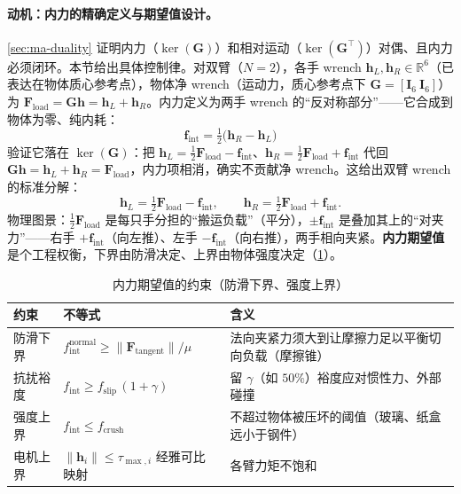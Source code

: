 \paragraph{动机：内力的精确定义与期望值设计。}
\cref{sec:ma-duality} 证明内力（$\ker(\mathbf{G})$）和相对运动（$\ker(\mathbf{G}^\top)$）对偶、且内力必须闭环。本节给出具体控制律。对双臂（$N=2$），各手 wrench $\mathbf{h}_L,\mathbf{h}_R\in\mathbb{R}^6$（已表达在物体质心参考点），物体净 wrench（运动力，质心参考点下 $\mathbf{G}=[\mathbf{I}_6\ \mathbf{I}_6]$）为 $\mathbf{F}_{\text{load}}=\mathbf{G}\mathbf{h}=\mathbf{h}_L+\mathbf{h}_R$。内力定义为两手 wrench 的“反对称部分”——它合成到物体为零、纯内耗：
\begin{equation}
  \boxed{\;\mathbf{f}_{\text{int}}=\tfrac12\big(\mathbf{h}_R-\mathbf{h}_L\big)\;}
  \label{eq:ma-fint}
\end{equation}
验证它落在 $\ker(\mathbf{G})$：把 $\mathbf{h}_L=\tfrac12\mathbf{F}_{\text{load}}-\mathbf{f}_{\text{int}}$、$\mathbf{h}_R=\tfrac12\mathbf{F}_{\text{load}}+\mathbf{f}_{\text{int}}$ 代回 $\mathbf{G}\mathbf{h}=\mathbf{h}_L+\mathbf{h}_R=\mathbf{F}_{\text{load}}$，内力项相消，确实不贡献净 wrench。这给出双臂 wrench 的标准分解：
\begin{equation}
  \mathbf{h}_L=\tfrac12\mathbf{F}_{\text{load}}-\mathbf{f}_{\text{int}},\qquad
  \mathbf{h}_R=\tfrac12\mathbf{F}_{\text{load}}+\mathbf{f}_{\text{int}}.
  \label{eq:ma-hLR}
\end{equation}
物理图景：$\tfrac12\mathbf{F}_{\text{load}}$ 是每只手分担的“搬运负载”（平分），$\pm\mathbf{f}_{\text{int}}$ 是叠加其上的“对夹力”——右手 $+\mathbf{f}_{\text{int}}$（向左推）、左手 $-\mathbf{f}_{\text{int}}$（向右推），两手相向夹紧。\textbf{内力期望值}是个工程权衡，下界由防滑决定、上界由物体强度决定（\cref{tab:ma-fint-bounds}）。

\begin{table}[H]\centering\small
\caption{内力期望值的约束（防滑下界、强度上界）}
\label{tab:ma-fint-bounds}
\begin{tabular}{lll}
\toprule
约束 & 不等式 & 含义 \\
\midrule
防滑下界 & $f_{\text{int}}^{\text{normal}}\ge \|\mathbf{F}_{\text{tangent}}\|/\mu$ & 法向夹紧力须大到让摩擦力足以平衡切向负载（摩擦锥） \\
抗扰裕度 & $f_{\text{int}}\ge f_{\text{slip}}\,(1+\gamma)$ & 留 $\gamma$（如 $50\%$）裕度应对惯性力、外部碰撞 \\
强度上界 & $f_{\text{int}}\le f_{\text{crush}}$ & 不超过物体被压坏的阈值（玻璃、纸盒远小于钢件） \\
电机上界 & $\|\mathbf{h}_i\|\le\tau_{\max,i}$ 经雅可比映射 & 各臂力矩不饱和 \\
\bottomrule
\end{tabular}
\end{table}


